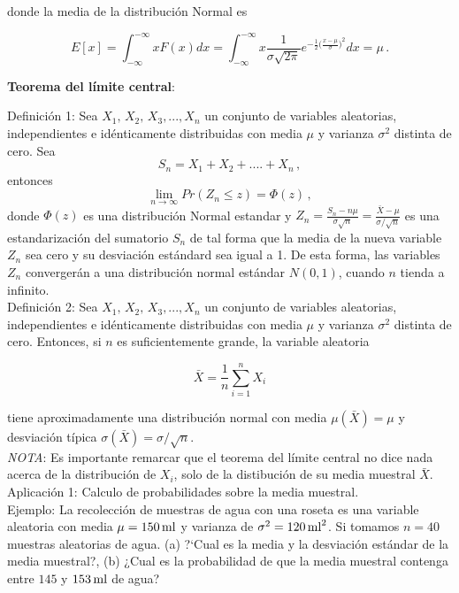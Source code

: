 \documentclass[
]{agujournal2019}
\begin{document}
donde la media de la distribución Normal es

\[E[x]=\int^{-\infty}_{-\infty} x F(x) dx=\int^{-\infty}_{-\infty} x \frac{1}{\sigma \sqrt{2\pi}}e^{-\frac{1}{2} \big( \frac{x-\mu}{\sigma} \big)^2 } dx=\mu\,.\]

\vspace{0.5cm}

\textbf{Teorema del límite central}:

Definición 1: Sea \(X_1,\,X_2,\,X_3,...,X_n\) un conjunto de variables
aleatorias, independientes e idénticamente distribuidas con media
\(\mu\) y varianza \(\sigma^2\) distinta de cero. Sea
\[S_n=X_1+X_2+....+X_n\,,\] entonces
\[\lim_{n \to\infty} Pr (Z_n\le z)= \Phi(z)\,,\] donde \(\Phi(z)\) es
una distribución Normal estandar y
\(Z_n=\frac{S_n - n\mu} {\sigma\sqrt{n}} = \frac{\bar{X} - \mu} {\sigma/\sqrt{n}}\)
es una estandarización del sumatorio \(S_n\) de tal forma que la media
de la nueva variable \(Z_n\) sea cero y su desviación estándard sea
igual a 1. De esta forma, las variables \(Z_n\) convergerán a una
distribución normal estándar \(N(0,1)\), cuando \(n\) tienda a
infinito.\\

Definición 2: Sea \(X_1,\,X_2,\,X_3,...,X_n\) un conjunto de variables
aleatorias, independientes e idénticamente distribuidas con media
\(\mu\) y varianza \(\sigma^2\) distinta de cero. Entonces, si \(n\) es
suficientemente grande, la variable aleatoria

\[\bar{X}=\frac{1}{n}\sum^n_{i=1}{X_i}\]

tiene aproximadamente una distribución normal con media
\(\mu(\bar{X})=\mu\) y desviación típica
\(\sigma(\bar{X})=\sigma/\sqrt{n}\).\\

\emph{NOTA}: Es importante remarcar que el teorema del límite central no
dice nada acerca de la distribución de \(X_i\), solo de la distibución
de su media muestral \(\bar{X}\).\\

Aplicación 1: Calculo de probabilidades sobre la media muestral.\\

Ejemplo: La recolección de muestras de agua con una roseta es una
variable aleatoria con media \(\mu=150\,{\rm ml}\) y varianza de
\(\sigma^2=120\,{\rm ml}^2\). Si tomamos \(n=40\) muestras aleatorias de
agua. (a) ?{}`Cual es la media y la desviación estándar de la media
muestral?, (b) ¿Cual es la probabilidad de que la media muestral
contenga entre \(145\) y \(153\,{\rm ml}\) de agua?\\
\end{document}

